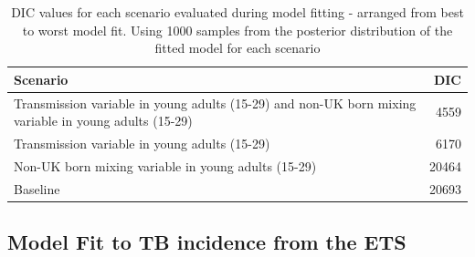 \documentclass[11pt,twoside]{bristolthesis}
\begin{document}
  \newpage
  \begin{longtable}{>{\raggedright\arraybackslash}p{10cm}r}
  \caption{\label{tab:09-scenarios-table}DIC values for each scenario evaluated during model fitting - arranged from best to worst model fit. Using 1000 samples from the posterior distribution of the fitted model for each scenario}\\
  \toprule
  Scenario & DIC\\
  \midrule
  Transmission variable in young adults (15-29) and non-UK born mixing variable in young adults (15-29) & 4559\\
  Transmission variable in young adults (15-29) & 6170\\
  Non-UK born mixing variable in young adults (15-29) & 20464\\
  Baseline & 20693\\
  \bottomrule
  \end{longtable}
  \hypertarget{model-fit-to-tb-incidence-from-the-ets}{%
  \subsection{Model Fit to TB incidence from the ETS}\label{model-fit-to-tb-incidence-from-the-ets}}
  
\end{document}
